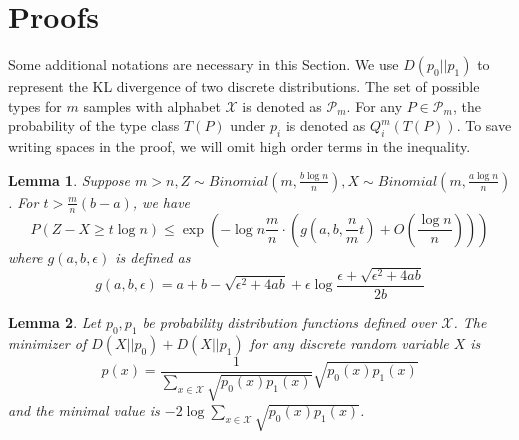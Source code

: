 \documentclass[conference]{IEEEtran}
\newtheorem{lemma}{Lemma}
\begin{document}
\section{Proofs}
Some additional notations are necessary in this Section. We use
$D(p_0||p_1)$ to represent the KL divergence of two discrete distributions. The set of possible types
for $m$ samples with alphabet $\mathcal{X}$ is denoted as $\mathcal{P}_m$. For any $P\in \mathcal{P}_m$, the probability of the type
class $T(P)$ under $p_i$ is denoted as $Q_i^{m}(T(P))$.
To save writing spaces in the proof, we will omit high order terms in the inequality.
\begin{lemma}\label{lem:zxt}
	Suppose $m > n, Z \sim Binomial(m, \frac{b\log n}{n}), X\sim Binomial(m, \frac{a\log n}{n})$.
	For $ t > \frac{m}{n}(b - a)$, we have
	\begin{equation}
	P(Z - X \geq t \log n) \leq \exp(-\log n \frac{m}{n}\cdot ( g(a, b, \frac{n}{m}t) + O(\frac{\log n}{n})))
	\end{equation}
	where $g(a,b,\epsilon)$ is defined as
	\begin{equation}\label{eq:gab}
	g(a,b,\epsilon) = a + b - \sqrt{\epsilon^2 + 4ab} + \epsilon \log \frac{\epsilon + \sqrt{\epsilon^2 + 4ab}}{2b}
	\end{equation}
\end{lemma}
\begin{lemma}\label{lem:p0p12}
	Let $p_0, p_1$ be probability distribution functions defined over $\mathcal{X}$. The minimizer
	of $D(X||p_0) + D(X||p_1)$ for any discrete random variable $X$ is
	\begin{equation}\label{eq:p012}
	p(x)=\frac{1}{ \sum_{x\in \mathcal{X}} \sqrt{p_0(x) p_1(x)}}\sqrt{p_0(x)p_1(x)}
	\end{equation}
	and the minimal value is
	$-2\log \sum_{x\in \mathcal{X}} \sqrt{p_0(x) p_1(x)}$.
\end{lemma}
\end{document}
